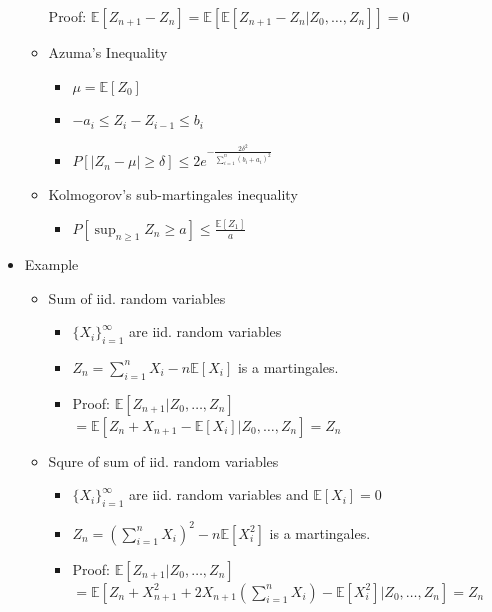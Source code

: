 \documentclass[a4paper]{article}
\begin{document}
\begin{itemize}
\begin{itemize}
                Proof: $\mathbb{E}[Z_{n+1} - Z_n] = \mathbb{E}[\mathbb{E}[Z_{n+1} - Z_n| Z_0, \dots, Z_n]] = 0$
            \item Azuma's Inequality
                \begin{itemize}
                    \item $\mu = \mathbb{E}[Z_0]$
                    \item $-a_i \leq Z_i - Z_{i-1} \leq b_i$
                    \item $P[|Z_n - \mu| \geq \delta] \leq 2 e^{- \frac{2\delta^2}{\sum_{i=1}^n(b_i + a_i)^2}}$
                \end{itemize}
            \item Kolmogorov's sub-martingales inequality
                \begin{itemize}
                    \item $P[\sup_{n \geq 1}Z_n \geq a] \leq \frac{\mathbb{E}[Z_1]}{a}$
                \end{itemize}
        \end{itemize}
    \item Example
        \begin{itemize}
            \item Sum of iid. random variables
                \begin{itemize}
                    \item $\{X_i\}_{i=1}^\infty$ are iid. random variables
                    \item $Z_n = \sum_{i=1}^n X_i - n \mathbb{E}[X_i]$ is a martingales.
                    \item Proof: $\mathbb{E}[Z_{n+1}| Z_0, \dots, Z_n]$
                        $= \mathbb{E}[Z_n + X_{n+1} - \mathbb{E}[X_i]| Z_0, \dots, Z_n] = Z_n$
                \end{itemize}
            \item Squre of sum of iid. random variables
                \begin{itemize}
                    \item $\{X_i\}_{i=1}^\infty$ are iid. random variables and $\mathbb{E}[X_i] = 0$
                    \item $Z_n = (\sum_{i=1}^n X_i)^2 - n \mathbb{E}[X_i^2]$ is a martingales.
                    \item Proof: $\mathbb{E}[Z_{n+1}| Z_0, \dots, Z_n]$
                        $= \mathbb{E}[Z_n + X_{n+1}^2 + 2X_{n+1}(\sum_{i=1}^n X_i) - \mathbb{E}[X_i^2]| Z_0, \dots, Z_n] = Z_n$
                \end{itemize}

\end{itemize}
\end{itemize}
\end{document}
